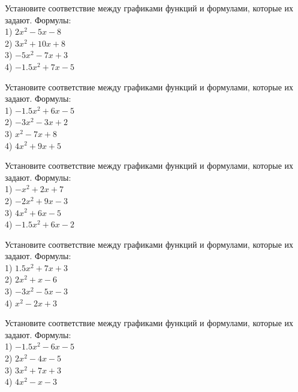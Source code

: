 \documentclass[4apaper]{article}
\begin{document}
\begin{taskBN}{1}
Установите соответствие между графиками функций и формулами, которые их задают. Формулы: \\1) $2x^2-5x-8$\\2) $3x^2+10x+8$\\3) $-5x^2-7x+3$\\4) $-1.5x^2+7x-5$
\end{taskBN}

\begin{taskBN}{2}
Установите соответствие между графиками функций и формулами, которые их задают. Формулы: \\1) $-1.5x^2+6x-5$\\2) $-3x^2-3x+2$\\3) $x^2-7x+8$\\4) $4x^2+9x+5$
\end{taskBN}

\begin{taskBN}{3}
Установите соответствие между графиками функций и формулами, которые их задают. Формулы: \\1) $-x^2+2x+7$\\2) $-2x^2+9x-3$\\3) $4x^2+6x-5$\\4) $-1.5x^2+6x-2$
\end{taskBN}

\begin{taskBN}{4}
Установите соответствие между графиками функций и формулами, которые их задают. Формулы: \\1) $1.5x^2+7x+3$\\2) $2x^2+x-6$\\3) $-3x^2-5x-3$\\4) $x^2-2x+3$
\end{taskBN}

\begin{taskBN}{5}
Установите соответствие между графиками функций и формулами, которые их задают. Формулы: \\1) $-1.5x^2-6x-5$\\2) $2x^2-4x-5$\\3) $3x^2+7x+3$\\4) $4x^2-x-3$
\end{taskBN}
\end{document}
